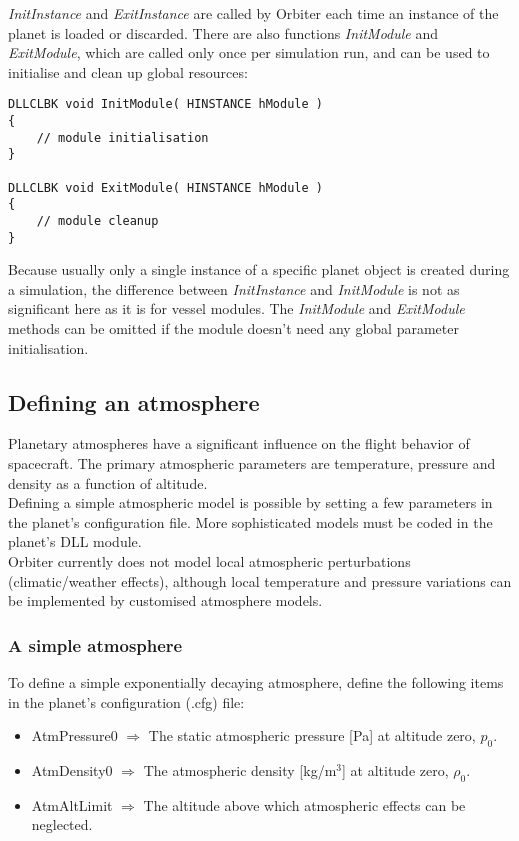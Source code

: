 \documentclass[Orbiter Developer Manual.tex]{subfiles}
\begin{document}
\noindent
\textit{InitInstance} and \textit{ExitInstance} are called by Orbiter each time an instance of the planet is loaded or discarded. There are also functions \textit{InitModule} and \textit{ExitModule}, which are called only once per simulation run, and can be used to initialise and clean up global resources:

\begin{lstlisting}
DLLCLBK void InitModule( HINSTANCE hModule )
{
	// module initialisation
}

DLLCLBK void ExitModule( HINSTANCE hModule )
{
	// module cleanup
}
\end{lstlisting}

\noindent
Because usually only a single instance of a specific planet object is created during a simulation, the difference between \textit{InitInstance} and \textit{InitModule} is not as significant here as it is for vessel modules. The \textit{InitModule} and \textit{ExitModule} methods can be omitted if the module doesn’t need any global parameter initialisation.


\subsection{Defining an atmosphere}
Planetary atmospheres have a significant influence on the flight behavior of spacecraft. The primary atmospheric parameters are temperature, pressure and density as a function of altitude.\\
Defining a simple atmospheric model is possible by setting a few parameters in the planet’s configuration file. More sophisticated models must be coded in the planet’s DLL module.\\
Orbiter currently does not model local atmospheric perturbations (climatic/weather effects), although local temperature and pressure variations can be implemented by customised atmosphere models.


\subsubsection{A simple atmosphere}
To define a simple exponentially decaying atmosphere, define the following items in the planet’s configuration (.cfg) file:

\begin{itemize}
\item AtmPressure0 $\Rightarrow$ The static atmospheric pressure [Pa] at altitude zero, $p_{0}$.
\item AtmDensity0 $\Rightarrow$ The atmospheric density [kg/m$^{3}$] at altitude zero, $\rho_{0}$.
\item AtmAltLimit $\Rightarrow$ The altitude above which atmospheric effects can be neglected.
\end{itemize}
\end{document}
